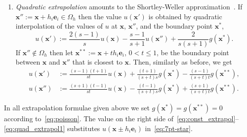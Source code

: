 \documentclass[a4paper,10pt,3p,final,pdftex]{elsarticle}
\begin{document}
\begin{enumerate}

\item \emph{Quadratic extrapolation} amounts to the Shortley-Weller
  approximation~\cite{fowa:60,shwe:39,mcgv:04}.  If $\mathbf{x}'' :=
  \mathbf{x} + h_i\mathbf{e}_i \in \Omega_h$ then the value
  $u(\mathbf{x}')$ is obtained by quadratic interpolation of the values
  of $u$ at $\mathbf{x}$, $\mathbf{x}''$, and the boundary point
  $\mathbf{x}^*$,
  \begin{equation} \label{eq:quad_extrapol}
    u(\mathbf{x}') := \frac{2(s\!-\!1)}{s} u(\mathbf{x}) -
    \frac{s\!-\!1}{s\!+\!1} u(\mathbf{x''}) + %
    \frac{2}{s(s\!+\!1)} g(\mathbf{x}^*).
  \end{equation}
  If $\mathbf{x}'' \not\in \Omega_h$ then let $\mathbf{x}^{**} :=
  \mathbf{x} + t h_i\mathbf{e}_i$, $0<t\le1$, be the boundary point
  between $\mathbf{x}$ and $\mathbf{x}''$ that is closest to
  $\mathbf{x}$.  Then, similarly as before, we get
  \begin{equation} \label{eq:quad_extrapol1}
    \begin{aligned}
      u(\mathbf{x}') &:= \frac{(s\!-\!1)(t\!+\!1)}{st} u(\mathbf{x}) +
      \frac{(t\!+\!1)}{(s\!+\!t)s} g(\mathbf{x}^*) -
      \frac{(s\!-\!1)}{(s\!+\!t)t} g(\mathbf{x}^{**}), \\[1mm]
      u(\mathbf{x}'') &:= \frac{(s\!+\!1)(t\!-\!1)}{st} u(\mathbf{x}) -
      \frac{(t\!-\!1)}{(s\!+\!t)s} g(\mathbf{x}^*) +
      \frac{(s\!+\!1)}{(s\!+\!t)t} g(\mathbf{x}^{**}).
    \end{aligned}
  \end{equation}
 
\end{enumerate}
In all extrapolation formulae given above we set $g(\mathbf{x}^*) =
g(\mathbf{x}^{**}) = 0$ according to~\eqref{eq:poisson}.  The value on
the right side of~\eqref{eq:const_extrapol}--\eqref{eq:quad_extrapol1}
substitutes $u(\mathbf{x}\! \pm \! h_i\mathbf{e}_i)$
in~\eqref{eq:7pt-star}.
\end{document}

